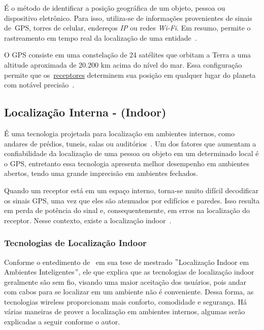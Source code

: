 É o método de identificar a posição geográfica de um objeto, pessoa ou dispositivo eletrônico.
Para isso, utiliza-se de informações provenientes de sinais de~\hypertarget{receptores}{GPS, torres de celular, endereços \textit{IP} ou redes  \textit{Wi-Fi}}.
Em resumo, permite o rastreamento em tempo real da localização de uma entidade~\cite{da2019sistemas}.

O GPS consiste em uma constelação de 24 satélites que orbitam a Terra a uma altitude aproximada de 20.200 km acima do nível do mar.
Essa configuração permite que os~\hyperlink{receptores}{receptores} determinem sua posição em qualquer lugar do planeta com notável precisão~\cite{el2002introduction}.

\subsection{Localização Interna - (Indoor)}\label{subsec:localizacao-indoor}

É uma tecnologia projetada para localização em ambientes internos, como andares de prédios, tuneis, salas ou auditórios~\cite{mittelstadt2018bluepath}.
Um dos fatores que aumentam a confiabilidade da localização de uma pessoa ou objeto em um determinado local é o GPS, entretanto essa tecnologia apresenta melhor desempenho em ambientes abertos, tendo uma grande imprecisão em ambientes fechados.

Quando um receptor está em um espaço interno, torna-se muito difícil decodificar os sinais GPS, uma vez que eles são atenuados por edifícios e paredes.
Isso resulta em perda de potência do sinal e, consequentemente, em erros na localização do receptor.
Nesse contexto, existe a localização indoor~\cite{mittelstadt2018bluepath}.

\subsubsection{Tecnologias de Localização Indoor}\label{subsubsec:tecnologias-localizacao-indoor}
Conforme o entedimento de~\cite{novais2014localizaccao} em sua tese de mestrado \("\)Localização Indoor em Ambientes Inteligentes\("\), ele que explica que as tecnologias de localização indoor geralmente são sem fio, visando uma maior aceitação dos usuários, pois andar com cabos para se localizar em um ambiente não é conveniente.
Dessa forma, as tecnologias wireless proporcionam mais conforto, comodidade e segurança.
Há várias maneiras de prover a localização em ambientes internos, algumas serão explicadas a seguir conforme o autor.

